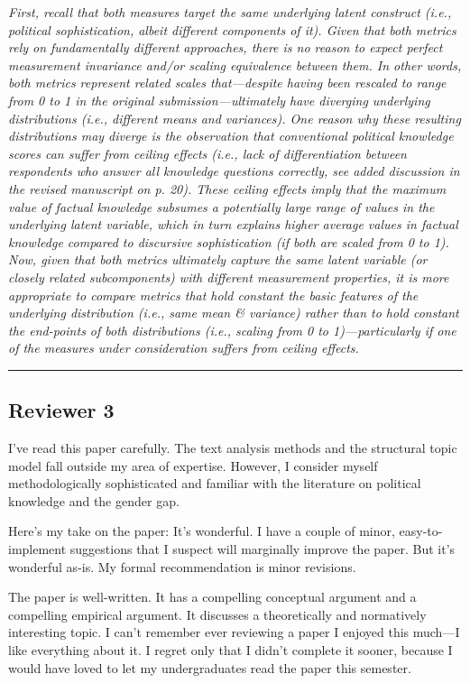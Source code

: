 \textit{First, recall that both measures target the same underlying latent construct (i.e., political sophistication, albeit different components of it). Given that both metrics rely on fundamentally different approaches, there is no reason to expect perfect measurement invariance and/or scaling equivalence between them. In other words, both metrics represent related scales that---despite having been rescaled to range from 0 to 1 in the original submission---ultimately have diverging underlying distributions (i.e., different means and variances). One reason why these resulting distributions may diverge is the observation that conventional political knowledge scores can suffer from ceiling effects (i.e., lack of differentiation between respondents who answer all knowledge questions correctly, see added discussion in the revised manuscript on p. 20). These ceiling effects imply that the maximum value of factual knowledge subsumes a potentially large range of values in the underlying latent variable, which in turn explains higher average values in factual knowledge compared to discursive sophistication (if both are scaled from 0 to 1). Now, given that both metrics ultimately capture the same latent variable (or closely related subcomponents) with different measurement properties, it is more appropriate to compare metrics that hold constant the basic features of the underlying distribution (i.e., same mean \& variance) rather than to hold constant the end-points of both distributions (i.e., scaling from 0 to 1)---particularly if one of the measures under consideration suffers from ceiling effects.}


\rule{\linewidth}{.01cm}


\subsection*{Reviewer 3}

I’ve read this paper carefully. The text analysis methods and the structural topic model fall outside my area of expertise. However, I consider myself methodologically sophisticated and familiar with the literature on political knowledge and the gender gap.

Here’s my take on the paper: It’s wonderful. I have a couple of minor, easy-to-implement suggestions that I suspect will marginally improve the paper. But it’s wonderful as-is. My formal recommendation is minor revisions.

The paper is well-written. It has a compelling conceptual argument and a compelling empirical argument. It discusses a theoretically and normatively interesting topic. I can’t remember ever reviewing a paper I enjoyed this much—I like everything about it. I regret only that I didn’t complete it sooner, because I would have loved to let my undergraduates read the paper this semester.

